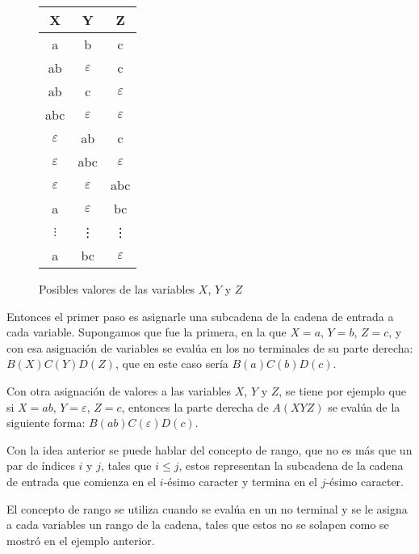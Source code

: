 \begin{figure}
    \centering
    \begin{tabular}{|c|c|c|}
        \hline
        X             & Y             & Z             \\
        \hline
        a             & b             & c             \\
        \hline
        ab            & $\varepsilon$ & c             \\
        \hline
        ab            & c             & $\varepsilon$ \\
        \hline
        abc           & $\varepsilon$ & $\varepsilon$ \\
        \hline
        $\varepsilon$ & ab            & c             \\
        \hline
        $\varepsilon$ & abc           & $\varepsilon$ \\
        \hline
        $\varepsilon$ & $\varepsilon$ & abc           \\
        \hline
        a             & $\varepsilon$ & bc            \\
        \hline
        $\vdots$      & \vdots        & \vdots        \\
        \hline
        a             & bc            & $\varepsilon$ \\
        \hline
    \end{tabular}
    \caption{Posibles valores de las variables $X$, $Y$ y $Z$}
    \label{fig:xyz_eaxmple}
\end{figure}

Entonces el primer paso es asignarle una subcadena de la cadena de entrada a cada variable.
Supongamos que fue la primera, en la que $X=a$, $Y = b$, $Z = c$, y con esa asignación de variables
se evalúa en los no terminales de su parte derecha: $B(X)C(Y)D(Z)$, que en este caso sería $B(a)C(b)D(c)$.

Con otra asignación de valores a las variables $X$, $Y$ y $Z$, se tiene por ejemplo que si $X=ab$, $Y = \varepsilon$, $Z=c$,
entonces la parte derecha de $A(XYZ)$ se evalúa de la siguiente forma: $B(ab)C(\varepsilon) D(c)$.

Con la idea anterior se puede hablar del concepto de rango, que no es más que un par de índices $i$ y $j$, tales que $i\leq j$, estos
representan la subcadena de la cadena de entrada que comienza en el $i$-ésimo caracter y termina en el $j$-ésimo caracter.

El concepto de rango se utiliza cuando se evalúa en un no terminal y se le asigna a cada variables un rango de la cadena, tales
que estos no se solapen como se mostró en el ejemplo anterior.

